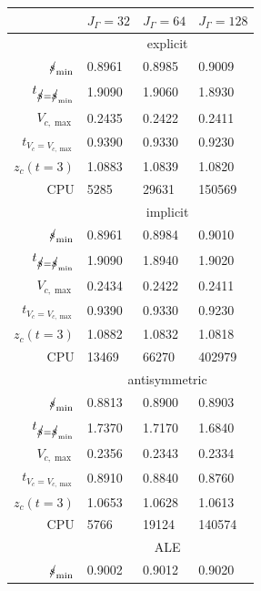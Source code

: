 \begin{table}
\center
\hspace*{-3.25cm}
\begin{tabular}{rlll}
\hline
 & $J_\Gamma=32$ & $J_\Gamma=64$ & $J_\Gamma=128$ \\
\hline
& \multicolumn{3}{c}{explicit} \\
\cmidrule{2-4}
$\mbox{$s\!\!\!\!\:/$}_{\min}$                & 0.8961 & 0.8985 & 0.9009 \\
$t_{\strikes = \strikes_{\min}}$ & 1.9090 & 1.9060 & 1.8930 \\
$V_{c,\max}$                     & 0.2435 & 0.2422 & 0.2411 \\
$t_{V_c = V_{c,\max}}$           & 0.9390 & 0.9330 & 0.9230 \\
$z_c(t=3)$                       & 1.0883 & 1.0839 & 1.0820 \\
CPU                              &   5285 &  29631 & 150569 \\
\cmidrule{2-4}
& \multicolumn{3}{c}{implicit} \\
\cmidrule{2-4}
$\mbox{$s\!\!\!\!\:/$}_{\min}$                & 0.8961 & 0.8984 & 0.9010 \\
$t_{\strikes = \strikes_{\min}}$ & 1.9090 & 1.8940 & 1.9020 \\
$V_{c,\max}$                     & 0.2434 & 0.2422 & 0.2411 \\
$t_{V_c = V_{c,\max}}$           & 0.9390 & 0.9330 & 0.9230 \\
$z_c(t=3)$                       & 1.0882 & 1.0832 & 1.0818 \\
CPU                              &  13469 &  66270 & 402979 \\
\cmidrule{2-4}
& \multicolumn{3}{c}{antisymmetric} \\
\cmidrule{2-4}
$\mbox{$s\!\!\!\!\:/$}_{\min}$                & 0.8813 & 0.8900 & 0.8903 \\
$t_{\strikes = \strikes_{\min}}$ & 1.7370 & 1.7170 & 1.6840 \\
$V_{c,\max}$                     & 0.2356 & 0.2343 & 0.2334 \\
$t_{V_c = V_{c,\max}}$           & 0.8910 & 0.8840 & 0.8760 \\
$z_c(t=3)$                       & 1.0653 & 1.0628 & 1.0613 \\
CPU                              &   5766 &  19124 & 140574 \\
\cmidrule{2-4}
& \multicolumn{3}{c}{ALE} \\
\cmidrule{2-4}
$\mbox{$s\!\!\!\!\:/$}_{\min}$                & 0.9002 & 0.9012 & 0.9020 \\

\end{tabular}
\end{table}
